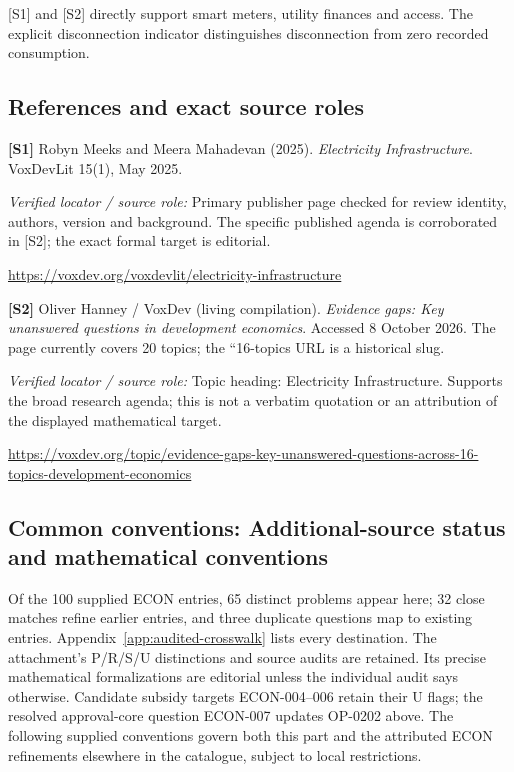 \documentclass[11pt,a4paper]{article}
\begin{document}
[S1] and [S2] directly support smart meters, utility finances and access. The explicit disconnection indicator distinguishes disconnection from zero recorded consumption.

\subsection*{References and exact source roles}

{\footnotesize\raggedright
\par\noindent\textbf{[S1]} Robyn Meeks and Meera Mahadevan (2025). \emph{Electricity Infrastructure}. VoxDevLit 15(1), May 2025.\par \textit{Verified locator / source role:} Primary publisher page checked for review identity, authors, version and background. The specific published agenda is corroborated in [S2]; the exact formal target is editorial.\par \url{https://voxdev.org/voxdevlit/electricity-infrastructure}\par\smallskip
\par\noindent\textbf{[S2]} Oliver Hanney / VoxDev (living compilation). \emph{Evidence gaps: Key unanswered questions in development economics}. Accessed 8 October 2026. The page currently covers 20 topics; the ``16-topics URL is a historical slug.\par \textit{Verified locator / source role:} Topic heading: Electricity Infrastructure. Supports the broad research agenda; this is not a verbatim quotation or an attribution of the displayed mathematical target.\par \url{https://voxdev.org/topic/evidence-gaps-key-unanswered-questions-across-16-topics-development-economics}\par\smallskip
}

\subsection*{Common conventions: Additional-source status and mathematical conventions}

\label{audited:conventions}

Of the 100 supplied ECON entries, 65 distinct problems appear here; 32 close
matches refine earlier entries, and three duplicate questions map to existing
entries. Appendix~\ref{app:audited-crosswalk} lists every destination.
The attachment's P/R/S/U distinctions and source audits are retained. Its
precise mathematical formalizations are editorial unless the individual audit
says otherwise. Candidate subsidy targets ECON-004--006 retain their U flags;
the resolved approval-core question ECON-007 updates OP-0202 above.
The following supplied conventions govern both this part and the attributed
ECON refinements elsewhere in the catalogue, subject to local restrictions.
\end{document}

